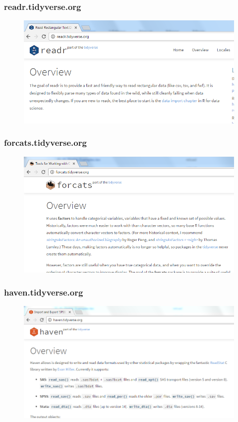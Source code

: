\documentclass{beamer}
\begin{document}
\begin{frame}
	\frametitle{readr.tidyverse.org}
	\begin{figure}
		\centering
		\includegraphics[width=1.05\linewidth]{images/readr-website}
		
	\end{figure}
	
\end{frame}
\begin{frame}
	\frametitle{forcats.tidyverse.org}
	\begin{figure}
\centering
\includegraphics[width=1.05\linewidth]{images/forcats-website}

\end{figure}

\end{frame}
\begin{frame}
	\frametitle{haven.tidyverse.org}
	\begin{figure}
		\centering
		\includegraphics[width=1.05\linewidth]{images/haven-website}
		
	\end{figure}
	
\end{frame}
\end{document}
